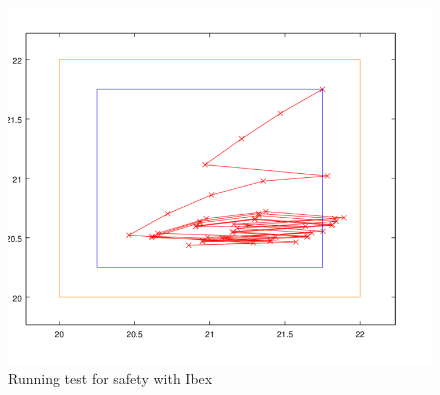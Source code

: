 \begin{figure}
    \includegraphics[width=\linewidth]{11}
    \caption{Running test for safety with Ibex}
    \label{fig:6}
\end{figure}


